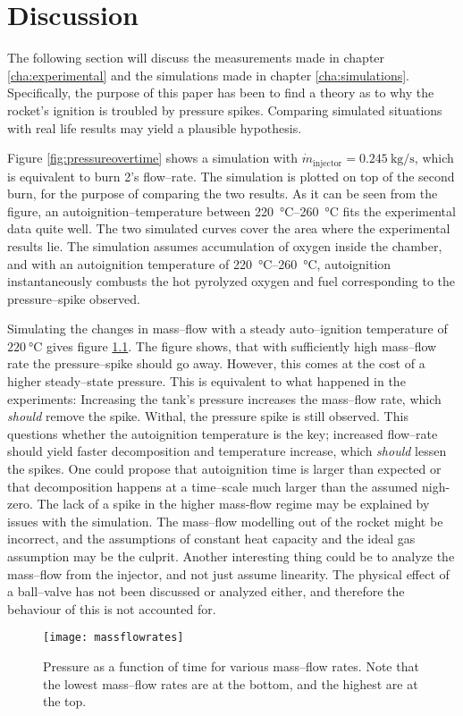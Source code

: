 \chapter{Discussion}

	The following section will discuss the measurements made in chapter \ref{cha:experimental} and the simulations made in chapter \ref{cha:simulations}. Specifically, the purpose of this paper has been to find a theory as to why the rocket's ignition is troubled by pressure spikes. Comparing simulated situations with real life results may yield a plausible hypothesis. 
	
	Figure \ref{fig:pressureovertime} shows a simulation with $\dot{m}_\text{injector} = \SI{0.245}{\kg\per\s}$, which is equivalent to burn 2's flow--rate. The simulation is plotted on top of the second burn, for the purpose of comparing the two results. As it can be seen from the figure, an autoignition--temperature between \SIrange{220}{260}{\celsius} fits the experimental data quite well. The two simulated curves cover the area where the experimental results lie. The simulation assumes accumulation of oxygen inside the chamber, and with an autoignition temperature of \SIrange{220}{260}{\celsius}, autoignition instantaneously combusts the hot pyrolyzed oxygen and fuel corresponding to the pressure--spike observed.
	
	Simulating the changes in mass--flow with a steady auto--ignition temperature of $\SI{220}{\celsius}$ gives figure \ref{fig:massflows}. The figure shows, that with sufficiently high mass--flow rate the pressure--spike should go away. However, this comes at the cost of a higher steady--state pressure. This is equivalent to what happened in the experiments: Increasing the tank's pressure increases the mass--flow rate, which \emph{should} remove the spike. Withal, the pressure spike is still observed. This questions whether the autoignition temperature is the key; increased flow--rate should yield faster decomposition and temperature increase, which \emph{should} lessen the spikes. One could propose that autoignition time is larger than expected or that decomposition happens at a time--scale much larger than the assumed nigh-zero. The lack of a spike in the higher mass-flow regime may be explained by issues with the simulation. 
	The mass--flow modelling out of the rocket might be incorrect, and the assumptions of constant heat capacity and the ideal gas assumption may be the culprit. Another interesting thing could be to analyze the mass--flow from the injector, and not just assume linearity. The physical effect of a ball--valve has not been discussed or analyzed either, and therefore the behaviour of this is not accounted for.
	
	
	\begin{figure}
		\centering
		\texttt{[image: massflowrates]}
		\caption{Pressure as a function of time for various mass--flow rates. Note that the lowest mass--flow rates are at the bottom, and the highest are at the top.}
		\label{fig:massflows}
	\end{figure}